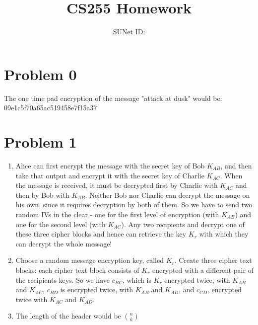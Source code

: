 \documentclass{article}
\title{CS255 Homework \esnumber}
\author{\studentname \qquad SUNet ID: \suid}
\begin{document}
\maketitle

\section*{Problem 0}
The one time pad encryption of the message "attack at dusk" would be: 09e1c5f70a65ac519458e7f15a37

\section*{Problem 1}
\begin{enumerate}
\item %
Alice can first encrypt the message with the secret key of Bob $K_{AB}$, and then take that output and encrypt it with the secret key of Charlie $K_{AC}$. When the message is received, it must be decrypted first by Charlie with $K_{AC}$ and then by Bob with $K_{AB}$. Neither Bob nor Charlie can decrypt the message on his own, since it requires decryption by both of them. So we have to send two random IVs in the clear - one for the first level of encryption (with $K_{AB}$) and one for the second level (with $K_{AC}$). Any two recipients and decrypt one of these three cipher blocks and hence can retrieve the key $K_r$ with which they can decrypt the whole message!

\item %
Choose a random message encryption key, called $K_r$. Create three cipher text blocks: each cipher text block consists of $K_r$ encrypted with a different pair of the recipients keys. So we have $c_{BC}$, which is $K_r$ encrypted twice, with $K_{AB}$ and $K_{AC}$, $c_{BD}$ is encrypted twice, with $K_{AB}$ and $K_{AD}$, and $c_{CD}$, encrypted twice with $K_{AC}$ and $K_{AD}$.


\item %
The length of the header would be $n \choose k$
\end{enumerate}
\end{document}
